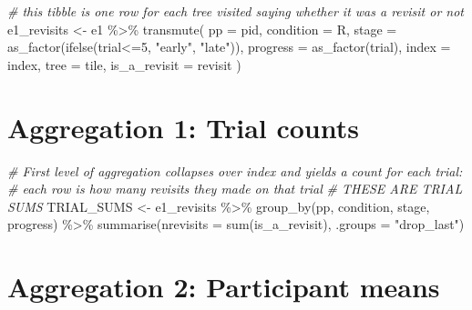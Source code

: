 \documentclass[
]{book}
\newenvironment{Shaded}{\begin{snugshade}}{\end{snugshade}}
\newcommand{\AttributeTok}[1]{\textcolor[rgb]{0.77,0.63,0.00}{#1}}
\newcommand{\CommentTok}[1]{\textcolor[rgb]{0.56,0.35,0.01}{\textit{#1}}}
\newcommand{\DecValTok}[1]{\textcolor[rgb]{0.00,0.00,0.81}{#1}}
\newcommand{\FunctionTok}[1]{\textcolor[rgb]{0.00,0.00,0.00}{#1}}
\newcommand{\NormalTok}[1]{#1}
\newcommand{\OtherTok}[1]{\textcolor[rgb]{0.56,0.35,0.01}{#1}}
\newcommand{\SpecialCharTok}[1]{\textcolor[rgb]{0.00,0.00,0.00}{#1}}
\newcommand{\StringTok}[1]{\textcolor[rgb]{0.31,0.60,0.02}{#1}}
\theoremstyle{definition}
\theoremstyle{definition}
\theoremstyle{definition}
\theoremstyle{definition}
\theoremstyle{remark}
\begin{document}
\begin{Shaded}
\begin{Highlighting}[]
\CommentTok{\# this tibble is one row for each tree visited saying whether it was a revisit or not}
\NormalTok{e1\_revisits }\OtherTok{\textless{}{-}}
\NormalTok{  e1 }\SpecialCharTok{\%\textgreater{}\%}
  \FunctionTok{transmute}\NormalTok{(}
    \AttributeTok{pp           =}\NormalTok{ pid,}
    \AttributeTok{condition    =}\NormalTok{ R,}
    \AttributeTok{stage        =} \FunctionTok{as\_factor}\NormalTok{(}\FunctionTok{ifelse}\NormalTok{(trial}\SpecialCharTok{\textless{}=}\DecValTok{5}\NormalTok{, }\StringTok{"early"}\NormalTok{, }\StringTok{"late"}\NormalTok{)),}
    \AttributeTok{progress     =} \FunctionTok{as\_factor}\NormalTok{(trial),}
    \AttributeTok{index        =}\NormalTok{ index,}
    \AttributeTok{tree         =}\NormalTok{ tile,}
    \AttributeTok{is\_a\_revisit =}\NormalTok{ revisit}
\NormalTok{  )}
\end{Highlighting}
\end{Shaded}

\hypertarget{aggregation-1-trial-counts}{%
\section{Aggregation 1: Trial counts}\label{aggregation-1-trial-counts}}

\begin{Shaded}
\begin{Highlighting}[]
\CommentTok{\# First level of aggregation collapses over index and yields a count for each trial: }
\CommentTok{\# each row is how many revisits they made on that trial}
\CommentTok{\# THESE ARE TRIAL SUMS}
\NormalTok{TRIAL\_SUMS }\OtherTok{\textless{}{-}}
\NormalTok{  e1\_revisits }\SpecialCharTok{\%\textgreater{}\%} 
  \FunctionTok{group\_by}\NormalTok{(pp, condition, stage, progress) }\SpecialCharTok{\%\textgreater{}\%} 
  \FunctionTok{summarise}\NormalTok{(}\AttributeTok{nrevisits =} \FunctionTok{sum}\NormalTok{(is\_a\_revisit), }\AttributeTok{.groups =} \StringTok{"drop\_last"}\NormalTok{)}
\end{Highlighting}
\end{Shaded}

\hypertarget{aggregation-2-participant-means}{%
\section{Aggregation 2: Participant means}\label{aggregation-2-participant-means}}
\end{document}
